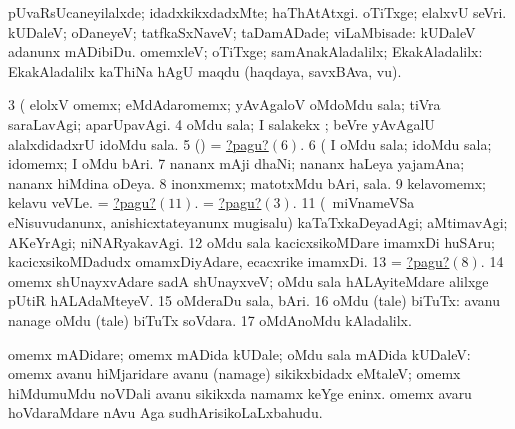 \noindent
\gl{\pagu}
\bmng
\bnum
{}  
\banum
{} pUvaRsUcaneyilalxde; idadxkikxdadxMte; haThAtAtxgi. 
 oTiTxge; elalxvU seVri. 
\eanum
\numie
{}  
\banum
{} kUDaleV; oDaneyeV; tatfkaSxNaveV; taDamADade; viLaMbisade:  kUDaleV adanunx mADibiDu. 
 omemxleV; oTiTxge; samAnakAladalilx; EkakAladalilx:  EkakAladalilx kaThiNa hAgU maqdu (haqdaya, savxBAva, \mo vu). 
\hypertarget{once pagu3}{} 
\eanum
\numie
\num{3}  (  elolxV omemx; eMdAdaromemx; yAvAgaloV oMdoMdu sala; tiVra saraLavAgi; aparUpavAgi. 
\num{4}  oMdu sala; I salakekx ; beVre yAvAgalU alalxdidadxrU idoMdu sala. 
\num{5}  (\birx) = \hyperlink{once pagu6}{?pagu?\((6)\)}. 
\hypertarget{once pagu6}{} 
\num{6}  (  I oMdu sala; idoMdu sala; idomemx; I oMdu bAri. 
\num{7}  nananx mAji dhaNi; nananx haLeya yajamAna; nananx hiMdina oDeya. 
\hypertarget{once pagu8}{} 
\num{8}  inonxmemx; matotxMdu bAri, sala. 
\num{9}  kelavomemx; kelavu veVLe. 
  
\banum
{} = \hyperlink{once pagu11}{?pagu?\((11)\)}. 
 = \hyperlink{once pagu3}{?pagu?\((3)\)}. 
\hypertarget{once pagu11}{} 
\eanum
\numie
\num{11}  (\kanmu\ miVnameVSa eNisuvudanunx, anishicxtateyanunx mugisalu) kaTaTxkaDeyadAgi; aMtimavAgi; AKeYrAgi; niNARyakavAgi. 
\num{12}  oMdu sala kacicxsikoMDare imamxDi huSAru; kacicxsikoMDadudx omamxDiyAdare, ecacxrike imamxDi. 
\num{13}  = \hyperlink{once pagu8}{?pagu?\((8)\)}. 
\num{14}  omemx shUnayxvAdare sadA shUnayxveV; oMdu sala hALAyiteMdare alilxge pUtiR hALAdaMteyeV. 
\num{15}  oMderaDu sala, bAri. 
\num{16}  oMdu (tale) biTuTx:  avanu nanage oMdu (tale) biTuTx soVdara. 
\num{17}  oMdAnoMdu kAladalilx. 
\enum
\emng
\eentry

\bentry
{}
\gl{\saMavayx}
\bmng
omemx mADidare; omemx mADida kUDale; oMdu sala mADida kUDaleV:  omemx avanu hiMjaridare avanu (namage) sikikxbidadx eMtaleV; omemx hiMdumuMdu noVDali avanu sikikxda namamx keYge eninx.  omemx avaru hoVdaraMdare nAvu Aga sudhArisikoLaLxbahudu. 
\emng
\eentry

